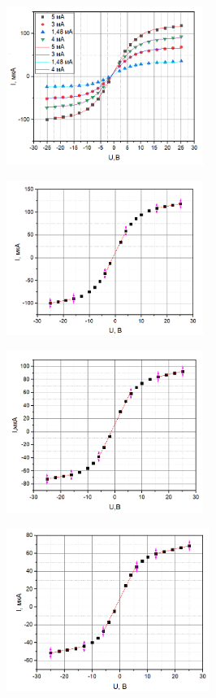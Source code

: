 \documentclass[a4paper]{article}
\begin{document}
\newpage

\begin{figure}[!h]
\centering
\includegraphics[width = 0.57\textwidth]{graph_2.png}
\end{figure}

\begin{figure}[!h]
\centering
\includegraphics[width = 0.57\textwidth]{graph_3.png}
\end{figure}

\begin{figure}[!h]
\centering
\includegraphics[width = 0.57\textwidth]{graph_4.png}
\end{figure}


\begin{figure}[!h]
\centering
\includegraphics[width = 0.59\textwidth]{graph_5.png}
\end{figure}
\end{document}
